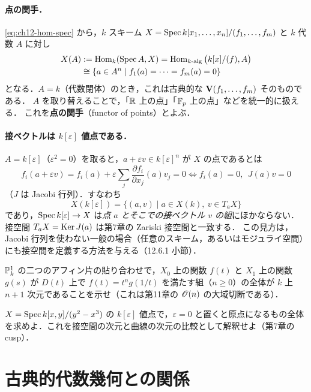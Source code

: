 \paragraph{点の関手．}
\eqref{eq:ch12-hom-spec} から，$k$ スキーム $X=\operatorname{Spec} k[x_1,\dots,x_n]/(f_1,\dots,f_m)$ と $k$ 代数 $A$ に対し
\begin{align*}
  X(A)&:=\operatorname{Hom}_{k}(\operatorname{Spec} A,X)=\operatorname{Hom}_{k\text{-alg}}\big(k[x]/(f),A\big)\\
  &\cong\{a\in A^n\mid f_1(a)=\dots=f_m(a)=0\}
\end{align*}
となる．$A=k$（代数閉体）のとき，これは古典的な $\mathbf{V}(f_1,\dots,f_m)$ そのものである．
$A$ を取り替えることで，「$\mathbb{R}$ 上の点」「$\mathbb{F}_p$ 上の点」などを統一的に扱える．
これを\textbf{点の関手}（functor of points）とよぶ．

\paragraph{接ベクトルは $k[\varepsilon]$ 値点である．}
$A=k[\varepsilon]$（$\varepsilon^2=0$）を取ると，$a+\varepsilon v\in k[\varepsilon]^n$ が $X$ の点であるとは
\[
  f_i(a+\varepsilon v)=f_i(a)+\varepsilon\sum_j\frac{\partial f_i}{\partial x_j}(a)v_j=0
  \iff f_i(a)=0,\ \ J(a)v=0
\]
（$J$ は Jacobi 行列）．すなわち
\[
  X(k[\varepsilon])=\{(a,v)\mid a\in X(k),\ v\in T_aX\}
\]
であり，$\operatorname{Spec} k[\varepsilon]\to X$ は\emph{点 $a$ とそこでの接ベクトル $v$ の組}にほかならない．
接空間 $T_aX=\operatorname{Ker} J(a)$ は第7章の Zariski 接空間と一致する．
この見方は，Jacobi 行列を使わない一般の場合（任意のスキーム，あるいはモジュライ空間）にも接空間を定義する方法を与える（12.6.1 小節）．

$\mathbb{P}^1_k$ の二つのアフィン片の貼り合わせで，$X_0$ 上の関数 $f(t)$ と $X_1$ 上の関数 $g(s)$ が $D(t)$ 上で $f(t)=t^n g(1/t)$ を満たす組（$n\ge0$）の全体が $k$ 上 $n+1$ 次元であることを示せ（これは第11章の $\mathscr{O}(n)$ の大域切断である）．

$X=\operatorname{Spec} k[x,y]/(y^2-x^3)$ の $k[\varepsilon]$ 値点で，$\varepsilon=0$ と置くと原点になるもの全体を求めよ．これを接空間の次元と曲線の次元の比較として解釈せよ（第7章の cusp）．

\section{古典的代数幾何との関係}

